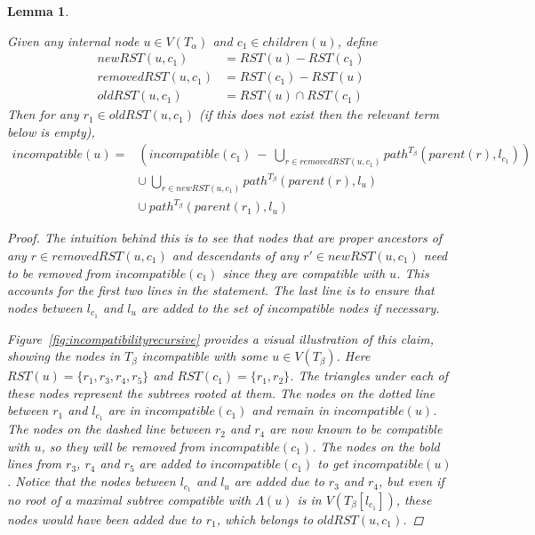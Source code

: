 \documentclass{article}
\newcommand{\leafset}{\Lambda}
\newtheorem{incompatibilityrecursive}[incompatibility]{Lemma}
\begin{document}
    \begin{incompatibilityrecursive}
        \label{lem:incompatibilityrecursive}

        Given any internal node $u \in V(T_\alpha)$ and $c_1 \in children(u)$, define
        \begin{align*}
            newRST(u, c_1) &= RST(u) - RST(c_1)\\[0.5em]
            removedRST(u, c_1) &= RST(c_1) - RST(u)\\[0.5em]
            oldRST(u, c_1) &= RST(u) \cap RST(c_1)
        \end{align*}
        Then for any $r_1 \in oldRST(u, c_1)$ (if this does not exist then the relevant term below is empty),
        \begin{align*}
            incompatible(u) = &\left(incompatible(c_1)\ -\ \bigcup_{r \in removedRST(u, c_1)} path^{T_\beta}(parent(r), l_{c_1})\right)\\
            &\cup\ \bigcup_{r \in newRST(u, c_1)} path^{T_\beta}(parent(r), l_u)\\
            &\cup\ path^{T_\beta}(parent(r_1), l_u)
        \end{align*}

        \begin{proof}
            The intuition behind this is to see that nodes that are proper ancestors of any $r \in removedRST(u, c_1)$ and descendants of any $r' \in newRST(u, c_1)$ need to be removed from $incompatible(c_1)$ since they are compatible with $u$. This accounts for the first two lines in the statement. The last line is to ensure that nodes between $l_{c_1}$ and $l_u$ are added to the set of incompatible nodes if necessary.

            Figure~\ref{fig:incompatibilityrecursive} provides a visual illustration of this claim, showing the nodes in $T_\beta$ incompatible with some $u \in V(T_\beta)$. Here $RST(u) = \{r_1, r_3, r_4, r_5\}$ and $RST(c_1) = \{r_1, r_2\}$. The triangles under each of these nodes represent the subtrees rooted at them. The nodes on the dotted line between $r_1$ and $l_{c_1}$ are in $incompatible(c_1)$ and remain in $incompatible(u)$. The nodes on the dashed line between $r_2$ and $r_4$ are now known to be compatible with $u$, so they will be removed from $incompatible(c_1)$. The nodes on the bold lines from $r_3$, $r_4$ and $r_5$ are added to $incompatible(c_1)$ to get $incompatible(u)$. Notice that the nodes between $l_{c_1}$ and $l_u$ are added due to $r_3$ and $r_4$, but even if no root of a maximal subtree compatible with $\leafset(u)$ is in $V(T_\beta[l_{c_1}])$, these nodes would have been added due to $r_1$, which belongs to $oldRST(u, c_1)$.


\end{proof}
\end{incompatibilityrecursive}
\end{document}
